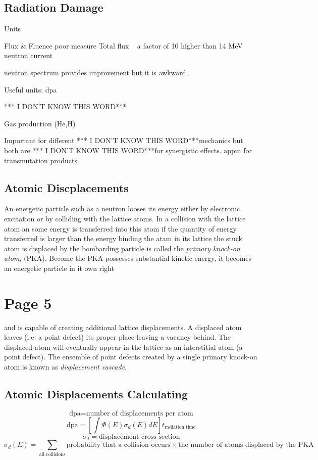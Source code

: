 \documentclass[11pt]{report} %
\newcommand{\IDK}{*** I DON'T KNOW THIS WORD***}
\begin{document}
\subsection{Radiation Damage}
Units

Flux \& Fluence poor measure
Total flux ~ a factor of 10 higher than 14 MeV neutron current

neutron spectrum provides improvement but it is awkward.

Useful units: dpa

\IDK

Gas production (He,H)

Important for different \IDK mechanics  but both are \IDK for synergistic effects.
appm for transmutation products

\subsection{Atomic Discplacements}
An energetic particle such as a neutron looses its energy either by electronic excitation or by colliding with the lattice atoms. In a collision with the lattice atom an some energy is transferred into this atom if the quantity of energy transferred is larger than the energy binding the atam in its lattice the stuck atom is displaced by the bombarding particle is called the \textit{primary knock-on atom}, (PKA). Become the PKA possesses substantial kinetic energy, it becomes an energetic particle in it own right

\section{Page 5}
and is capable of creating additional lattice displacements. A displaced atom leaves (i.e. a point defect) its proper place leaving a vacancy behind. The displaced atom will eventually appear in the lattice as an interstitial atom (a point defect). The ensemble of point defects created by a single primary knock-on atom is known as \textit{displacement cascade}.

\subsection{Atomic Displacements Calculating}
\begin{equation}
	\text{dpa} = \text{number of displacements per atom}
\end{equation}
\begin{equation}
	\text{dpa} = \left[ \int \Phi(E) \sigma_d (E) dE \right] t_{\text{radiation time}}
\end{equation}
\begin{equation}
	\sigma_d = \text{displacement cross section}
\end{equation}
\begin{equation}
	\sigma_d(E) = \sum_{\text{all collisions}} \text{probability that a collision occurs} \times \text{the number of atoms displaced by the PKA}
\end{equation}
\end{document}
